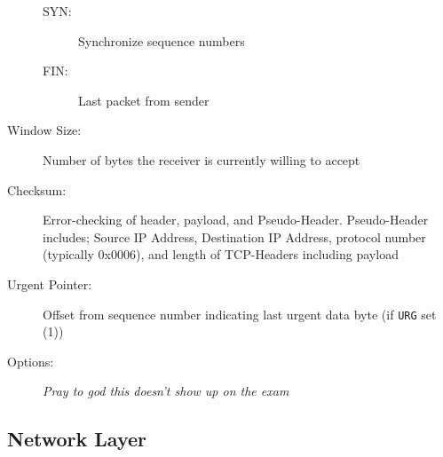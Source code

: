 \begin{description}
\begin{description}
		\item[SYN:] Synchronize sequence numbers
		\item[FIN:] Last packet from sender
	\end{description}
	\item[Window Size:] Number of bytes the receiver is currently willing to accept
	\item[Checksum:] Error-checking of header, payload, and Pseudo-Header. Pseudo-Header includes; Source IP Address, Destination IP Address, protocol number (typically 0x0006), and length of TCP-Headers including payload
	\item[Urgent Pointer:] Offset from sequence number indicating last urgent data byte (if \texttt{URG} set (1))
	\item[Options:] \textit{Pray to god this doesn't show up on the exam}
\end{description}

\subsection{Network Layer}
